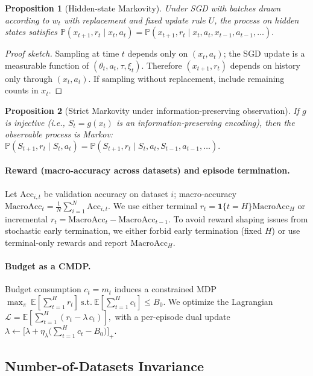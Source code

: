 \documentclass[11pt]{article}
\newtheorem{proposition}{Proposition}
\newcommand{\MacroAcc}{\mathrm{MacroAcc}}
\newcommand{\E}{\mathbb{E}}
\newcommand{\1}{\mathbf{1}}
\newcommand{\Prb}{\mathbb{P}}
\begin{document}
\begin{proposition}[Hidden-state Markovity]
Under SGD with batches drawn according to $w_t$ \emph{with replacement} and fixed update rule $U$, the process on hidden states satisfies
\(
\Prb(x_{t+1},r_t \mid x_t,a_t)=\Prb(x_{t+1},r_t \mid x_t,a_t,x_{t-1},a_{t-1},\dots).
\)
\end{proposition}
\begin{proof}[Proof sketch]
Sampling at time $t$ depends only on $(x_t,a_t)$; the SGD update is a measurable function of $(\theta_t,a_t,\tau,\xi_t)$.
Therefore $(x_{t+1},r_t)$ depends on history only through $(x_t,a_t)$.
If sampling without replacement, include remaining counts in $x_t$.
\end{proof}

\begin{proposition}[Strict Markovity under information-preserving observation]\label{prop:inject}
If $g$ is injective (i.e., $S_t=g(x_t)$ is an information-preserving encoding), then the observable process is Markov:
\(
\Prb(S_{t+1},r_t \mid S_t,a_t)=\Prb(S_{t+1},r_t \mid S_t,a_t,S_{t-1},a_{t-1},\dots).
\)
\end{proposition}

\paragraph{Reward (macro-accuracy across datasets) and episode termination.}
Let $\mathrm{Acc}_{i,t}$ be validation accuracy on dataset $i$; macro-accuracy $\MacroAcc_t=\frac{1}{N}\sum_{i=1}^N \mathrm{Acc}_{i,t}$.
We use either terminal $r_t=\1\{t=H\}\MacroAcc_H$ or incremental $r_t=\MacroAcc_t-\MacroAcc_{t-1}$.
To avoid reward shaping issues from stochastic early termination, we either forbid early termination (fixed $H$) or use terminal-only rewards and report $\MacroAcc_H$.

\paragraph{Budget as a CMDP.}
Budget consumption $c_t=m_t$ induces a constrained MDP
\(
\max_\pi \ \E[\sum_{t=1}^H r_t]\ \text{s.t.}\ \E[\sum_{t=1}^H c_t]\le B_0.
\)
We optimize the Lagrangian
\(
\mathcal{L}=\E\!\left[\sum_{t=1}^H (r_t-\lambda\,c_t)\right],
\)
with a per-episode dual update
\(
\lambda \leftarrow \big[\lambda + \eta_\lambda\big(\sum_{t=1}^H c_t - B_0\big)\big]_+.
\)

\subsection{Number-of-Datasets Invariance}\label{sec:invariance}
\end{document}
